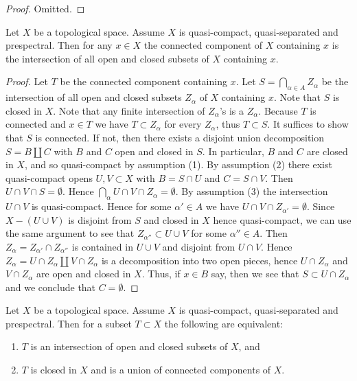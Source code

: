 \begin{proof}
  Omitted.
\end{proof}

\begin{lemma}
  \label{thm:connected-component-intersection-closed-open}
  Let $X$ be a topological space. Assume $X$ is quasi-compact, quasi-separated
  and prespectral. Then for any $x \in X$ the connected component of $X$ containing $x$ is
  the intersection of all open and closed subsets of $X$ containing $x$.
\end{lemma}

\begin{proof}
  Let $T$ be the connected component containing $x$. Let $S = \bigcap_{\alpha \in A} Z_\alpha$ be the intersection of all open and closed subsets $Z_\alpha$ of $X$ containing $x$. Note that $S$ is closed in $X$. Note that any finite intersection of $Z_\alpha$'s is a $Z_\alpha$. Because $T$ is connected and $x \in T$ we have $T \subset Z_\alpha$ for every \(Z_\alpha\), thus \(T \subset S\). It suffices to show that $S$ is connected. If not, then there exists a disjoint union decomposition $S = B \amalg C$ with $B$ and $C$ open and closed in $S$. In particular, $B$ and $C$ are closed in $X$, and so quasi-compact by assumption (1). By assumption (2) there exist quasi-compact opens $U, V \subset X$ with $B = S \cap U$ and $C = S \cap V$. Then $U \cap V \cap S = \emptyset$. Hence $\bigcap_\alpha U \cap V \cap Z_\alpha = \emptyset$. By assumption (3) the intersection $U \cap V$ is quasi-compact. Hence for some $\alpha' \in A$ we have $U \cap V \cap Z_{\alpha'} = \emptyset$. Since $X - (U \cup V)$ is disjoint from $S$ and closed in $X$ hence quasi-compact, we can use the same argument to see that $Z_{\alpha''} \subset U \cup V$ for some $\alpha'' \in A$. Then $Z_\alpha = Z_{\alpha'} \cap Z_{\alpha''}$ is contained in $U \cup V$ and disjoint from $U \cap V$. Hence $Z_\alpha = U \cap Z_\alpha \amalg V \cap Z_\alpha$ is a decomposition into two open pieces, hence $U \cap Z_\alpha$ and $V \cap Z_\alpha$ are open and closed in $X$. Thus, if $x \in B$ say, then we see that $S \subset U \cap Z_\alpha$ and we conclude that $C = \emptyset$.
\end{proof}

\begin{lemma}
  \label{thm:intersection-closed-open-iff} %
  Let $X$ be a topological space. Assume $X$ is quasi-compact, quasi-separated
  and prespectral. Then for a subset $T \subset X$ the following are equivalent:
  \begin{enumerate}
    \item $T$ is an intersection of open and closed subsets of $X$, and
    \item $T$ is closed in $X$ and is a union of connected components of $X$.
  \end{enumerate}
\end{lemma}

